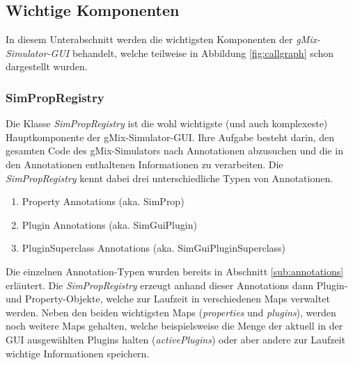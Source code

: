 \documentclass[a4paper, 11pt]{article} %
\begin{document}

\subsection{Wichtige Komponenten} %
\label{ssub:einzelne_komponenten}
In diesem Unterabschnitt werden die wichtigsten Komponenten der \emph{gMix-Simulator-GUI} behandelt, welche teilweise in Abbildung \ref{fig:callgraph} schon dargestellt wurden.

\subsubsection{SimPropRegistry}
\label{sssub:simpropregistry}
Die Klasse \emph{SimPropRegistry} ist die wohl wichtigste (und auch komplexeste) Hauptkomponente der gMix-Simulator-GUI. Ihre Aufgabe besteht darin, den gesamten Code des gMix-Simulators nach Annotationen abzusuchen und die in den Annotationen enthaltenen Informationen zu verarbeiten. Die \emph{SimPropRegistry} kennt dabei drei unterschiedliche Typen von Annotationen.

\begin{enumerate}
	\item Property Annotations (aka. SimProp)
	\item Plugin Annotations (aka. SimGuiPlugin)
	\item PluginSuperclass Annotations (aka. SimGuiPluginSuperclass)
\end{enumerate}

Die einzelnen Annotation-Typen wurden bereits in Abschnitt \ref{sub:annotations} erläutert. Die \emph{SimPropRegistry} erzeugt anhand dieser Annotations dann Plugin- und Property-Objekte, welche zur Laufzeit in verschiedenen Maps verwaltet werden. Neben den beiden wichtigsten Maps (\emph{properties} und \emph{plugins}), werden noch weitere Maps gehalten, welche beispielsweise die Menge der aktuell in der GUI ausgewählten Plugins halten (\emph{activePlugins}) oder aber andere zur Laufzeit wichtige Informationen speichern.\\
\end{document}
